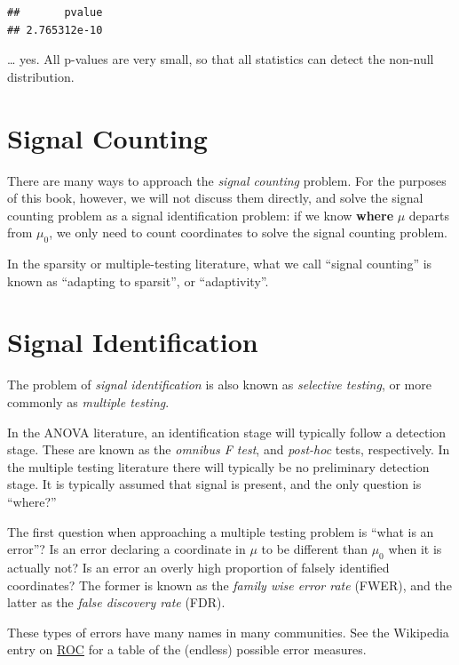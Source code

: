 \documentclass[]{book}
\theoremstyle{definition}
\theoremstyle{definition}
\theoremstyle{definition}
\theoremstyle{remark}
\let\BeginKnitrBlock\begin \let\EndKnitrBlock\end
\begin{document}
\begin{verbatim}
##       pvalue 
## 2.765312e-10
\end{verbatim}

\ldots{} yes. All p-values are very small, so that all statistics can
detect the non-null distribution.

\section{Signal Counting}\label{signal-counting}

There are many ways to approach the \emph{signal counting} problem. For
the purposes of this book, however, we will not discuss them directly,
and solve the signal counting problem as a signal identification
problem: if we know \textbf{where} \(\mu\) departs from \(\mu_0\), we
only need to count coordinates to solve the signal counting problem.

\BeginKnitrBlock{remark}
{}In the sparsity or multiple-testing
literature, what we call ``signal counting'' is known as ``adapting to
sparsit'', or ``adaptivity''.
\EndKnitrBlock{remark}

\section{Signal Identification}\label{identification}

The problem of \emph{signal identification} is also known as
\emph{selective testing}, or more commonly as \emph{multiple testing}.

In the ANOVA literature, an identification stage will typically follow a
detection stage. These are known as the \emph{omnibus F test}, and
\emph{post-hoc} tests, respectively. In the multiple testing literature
there will typically be no preliminary detection stage. It is typically
assumed that signal is present, and the only question is ``where?''

The first question when approaching a multiple testing problem is ``what
is an error''? Is an error declaring a coordinate in \(\mu\) to be
different than \(\mu_0\) when it is actually not? Is an error an overly
high proportion of falsely identified coordinates? The former is known
as the \emph{family wise error rate} (FWER), and the latter as the
\emph{false discovery rate} (FDR).

\BeginKnitrBlock{remark}
{}These types of errors have many names in many
communities. See the Wikipedia entry on
\href{https://en.wikipedia.org/wiki/Receiver_operating_characteristic}{ROC}
for a table of the (endless) possible error measures.
\EndKnitrBlock{remark}
\end{document}
